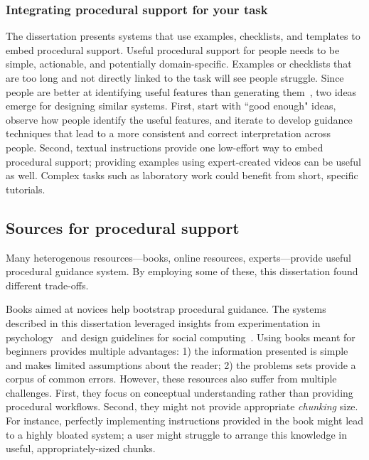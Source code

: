 \subsubsection{Integrating procedural support for your task}
The dissertation presents systems that use examples, checklists, and templates to embed procedural support. Useful procedural support for people needs to be simple, actionable, and potentially domain-specific. Examples or checklists that are too long and not directly linked to the task will see people struggle. Since people are better at identifying useful features than generating them~\cite{Stahl2006}, two ideas emerge for designing similar systems. First, start with ``good enough" ideas, observe how people identify the useful features, and iterate to develop guidance techniques that lead to a more consistent and correct interpretation across people. Second, textual instructions provide one low-effort way to embed procedural support; providing examples using expert-created videos can be useful as well. Complex tasks such as laboratory work could benefit from short, specific tutorials.

\subsection{Sources for procedural support}
Many heterogenous resources---books, online resources, experts---provide useful procedural guidance system. By employing some of these, this dissertation found different trade-offs.

Books aimed at novices help bootstrap procedural guidance. The systems described in this dissertation leveraged insights from experimentation in psychology~\cite{Martin2007} and design guidelines for social computing~\cite{Resnick2011}. Using books meant for beginners provides multiple advantages: 1) the information presented is simple and makes limited assumptions about the reader; 2) the problems sets provide a corpus of common errors. However, these resources also suffer from multiple challenges. First, they focus on conceptual understanding rather than providing procedural workflows. Second, they might not provide appropriate \textit{chunking} size. For instance, perfectly implementing instructions provided in the book might lead to a highly bloated system; a user might struggle to arrange this knowledge in useful, appropriately-sized chunks.

